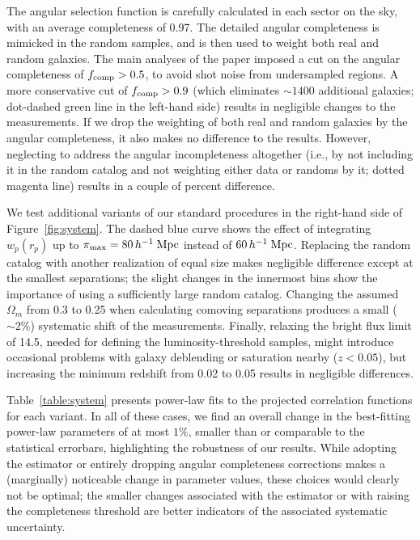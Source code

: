 \documentclass[]{emulateapj}
\newcommand{\hmpc}{\,h^{-1}\;{\rm Mpc}}
\newcommand{\wrp}{{w_p(r_p)}}
\begin{document}
The angular selection function is carefully calculated in each sector on
the sky,  with an average completeness of 0.97. The detailed angular
completeness is mimicked in the random samples, and is then used to weight
both real and random galaxies. 
The main analyses of the paper imposed a cut on the angular
completeness  of $f_{\rm comp}>0.5$, to avoid shot noise
from undersampled regions. A more conservative cut of $f_{\rm comp}>0.9$ 
(which eliminates $\sim 1400$ additional galaxies; dot-dashed green
line in the left-hand side) results in negligible changes to the measurements.
If we drop the weighting of
both real and random galaxies by the angular completeness, it also 
makes no difference to the results.  However, neglecting to address
the angular incompleteness altogether (i.e., by not including it in the
random catalog and not weighting either data or randoms by it; dotted
magenta line) results in a couple of percent difference. 

We test additional variants of our standard procedures
in the right-hand side of Figure~\ref{fig:system}.
The dashed blue curve shows the effect of integrating $\wrp$ up to 
$\pi_{\rm max}=80\hmpc$ instead of $60 \hmpc$.  Replacing the random catalog 
with another realization of equal size
makes negligible difference except at the smallest 
separations; the slight changes in the innermost bins show
the importance of using a sufficiently large random catalog.
Changing the assumed $\Omega_m$ from 0.3 to 0.25 when calculating
comoving separations produces a small ($\sim 2\%$) systematic shift
of the measurements.
Finally, relaxing the bright flux limit of 14.5, needed for defining
the luminosity-threshold  samples, might introduce occasional problems
with galaxy deblending or saturation nearby ($z<0.05$), but increasing 
the minimum redshift from 0.02 to 0.05 results in negligible differences.

Table~\ref{table:system} presents power-law fits to  
the projected correlation functions for each variant.
In all of these cases, we find an overall change in the best-fitting
power-law parameters of at most $1\%$, 
smaller than or comparable to the statistical
errorbars, highlighting the robustness of our results.
While adopting the \cite{davis83} estimator or entirely
dropping angular completeness corrections makes a (marginally)
noticeable change in parameter values, these choices would
clearly not be optimal; the smaller changes associated with
the \cite{hamilton93} estimator or with raising the completeness
threshold are better indicators of the associated systematic
uncertainty.  
\end{document}
